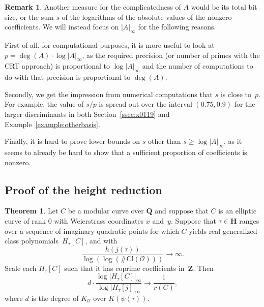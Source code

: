\documentclass{amsart}
\newcommand{\QQ}{\mathbf{Q}}
\newcommand{\HH}{\mathbf{H}}
\newcommand{\ZZ}{\mathbf{Z}}
\newcommand{\F}{H_\tau[\curve]}
\newcommand{\Fj}{H_\tau[j]}
\newcommand{\HC}{H_\tau[\curve]}
\newcommand{\Cl}{\mathrm{Cl}}
\newcommand{\mc}{\mathcal}
\newcommand{\curve}{C}
\numberwithin{equation}{section}
\theoremstyle{definition}
\newtheorem{theorem}[equation]{Theorem}
\newtheorem{remark}[equation]{Remark}
\begin{document}
\begin{remark}\label{rem:bitsize}
Another measure for the complicatedness of $A$ would be its total
bit size, or the sum $s$ of the logarithms of the absolute values of the nonzero coefficients.
We will instead focus on $|A|_\infty$ for the following reasons.

First of all, for computational purposes, it is more useful to look at $p = \deg(A)\cdot \log|A|_\infty$,
as the required precision (or number of primes with the CRT approach) is proportional to $\log|A|_\infty$
and the number of computations to do with that precision is proportional to $\deg(A)$.

Secondly, we get the impression from numerical computations that
$s$ is close to~$p$. For example, the value of $s/p$ is spread out over the interval $(0.75,  0.9)$ for the larger
discriminants in both Section~\ref{ssec:x0119} and Example~\ref{example:otherbasis}.

Finally, it is hard to prove lower bounds on $s$ other than $s\geq \log|A|_\infty$,
as it seems to already be hard to show that a sufficient proportion of coefficients is nonzero.
\end{remark}

\subsection{Proof of the height reduction}


\begin{theorem}\label{thm:reductionhyper}
	Let $C$ be a modular curve over $\QQ$
	and suppose that $C$ is an elliptic curve
	of rank $0$
	with Weierstrass coordinates $x$ and~$y$.
	Suppose that $\tau\in\HH$ ranges over a sequence of imaginary quadratic points
	for which $C$
	yields real generalized class polynomials~$\HC$, and with
	\begin{equation}\label{eq:limithypothesis}
		\frac{h(j(\tau))}{\log(\log(\#\Cl(\mathcal{O})))}\rightarrow \infty.
	\end{equation}
	Scale each $\F$ such that it has coprime coefficients in~$\ZZ$.
	Then
	$$
	d\cdot \frac{\log|\F|_\infty}{\log|\Fj|_\infty}\rightarrow \frac{1}{r(\curve)},$$
where $d$ is the degree of $K_{\mc{O}}$ over $K(\psi(\tau))$.
\end{theorem}
\end{document}

